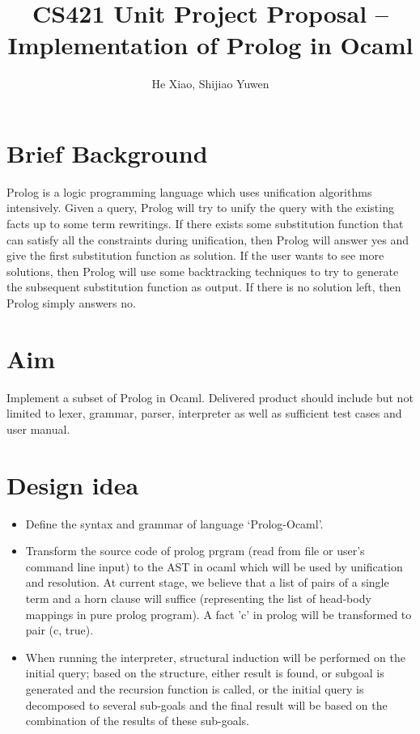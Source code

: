 \documentclass[11pt,a4paper]{report}
\author{He Xiao, Shijiao Yuwen}
\title{CS421 Unit Project Proposal -- Implementation of Prolog in Ocaml}
\begin{document}
	\maketitle
	
	\section*{Brief Background}
		Prolog is a logic programming language which uses unification algorithms intensively. Given a query, Prolog will try to unify the query with the existing facts up to some term rewritings. If there exists some substitution function that can satisfy all the constraints during unification, then Prolog will answer yes and give the first substitution function as solution. If the user wants to see more solutions, then Prolog will use some backtracking techniques to try to generate the subsequent substitution function as output. If there is no solution left, then Prolog simply answers no. 
		
	\section*{Aim}
		Implement a subset of Prolog in Ocaml. Delivered product should include but not limited to lexer, grammar, parser, interpreter as well as sufficient test cases and user manual.

	\section*{Design idea}
		\begin{itemize}
			\item Define the syntax and grammar of language `Prolog-Ocaml'.
			
			\item Transform the source code of prolog prgram (read from file or user's command line input) to the AST in ocaml which will be used by unification and resolution. At current stage,
			we believe that a list of pairs of a single term and a horn clause will suffice (representing the list of head-body mappings in pure prolog program). 
			A fact 'c' in prolog will be transformed to pair (c, true).
			
			\item When running the interpreter, structural induction will be performed on the initial query; based on the structure, either result is found, or subgoal is generated and the recursion function is called, or the initial query is decomposed to several sub-goals and the final result will be based on the combination of the results of these sub-goals. 
		\end{itemize}
			
\end{document}
